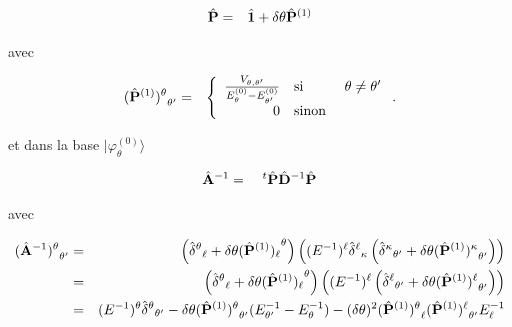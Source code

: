 \begin{eqnarray*}
	\hat{\mathbf{P}} & = & 	\hat{\mathbf{1}}	 + \delta \theta \hat{\mathbf{P}}^{(1)}
\end{eqnarray*}

avec 

\begin{eqnarray*}
	 {(\operator{P}^{(1)})^{\theta}}_{\theta'} & = & \left \{ \begin{array}{rll} \frac{ V_{\theta,\theta'}}{ E_{\theta}^{(0)} - E_{\theta'}^{(0)} } & \mbox{si} & \theta \neq \theta' \\ 0 & \mbox{sinon}    \end{array}\right.	.	
\end{eqnarray*}

et dans la base $\vert \varphi_\theta^{(0)} \rangle $

\begin{eqnarray*}
	\hat{\mathbf{A}}^{-1} & = & {~}^t\hat{\mathbf{P}}\hat{\mathbf{D}}^{-1} \hat{\mathbf{P}}	
\end{eqnarray*}

avec 

\begin{eqnarray*}
	{(\operator{A}^{-1})^{\theta}}_{\theta'} & = & \left ({\operator{\delta}^{\theta}}_\ell +  \delta \theta {(\operator{P}^{(1)})_\ell}^\theta  \right )  \left ( 	(E^{-1})^\ell {\operator{\delta}^\ell}_\kappa \left ({\operator{\delta}^\kappa}_{\theta'} +  \delta \theta {(\operator{P}^{(1)})^\kappa}_{\theta'} \right ) \right )\\%
	& = &   \left ({\operator{\delta}^{\theta}}_\ell +  \delta \theta {(\operator{P}^{(1)})_\ell}^\theta  \right )  \left ( 	(E^{-1})^\ell  \left ({\operator{\delta}^\ell}_{\theta'} +  \delta \theta {(\operator{P}^{(1)})^\ell}_{\theta'} \right ) \right ) \\ %
	& = & (E^{-1})^\theta  {\operator{\delta}^\theta}_{\theta'} - \delta \theta {(\operator{P}^{(1)})^\theta}_{\theta'} (  E_{\theta'}^{-1} - E_\theta^{-1}   ) - (\delta \theta)^2 {(\operator{P}^{(1)})^\theta}_{\ell}{(\operator{P}^{(1)})^\ell}_{\theta'}  E_{\ell}^{-1} %
\end{eqnarray*}

